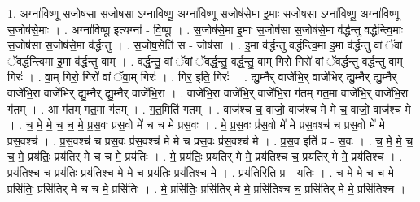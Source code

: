 \documentclass[17pt]{extarticle}
\begin{document}
1. अग्ना॑विष्णू स॒जोष॑सा स॒जोष॒सा ऽग्ना॑विष्णू॒ अग्ना॑विष्णू स॒जोष॑से॒मा इ॒माः स॒जोष॒सा ऽग्ना॑विष्णू॒ अग्ना॑विष्णू स॒जोष॑से॒माः । . अग्ना॑विष्णू॒ इत्यग्ना᳚ - वि॒ष्णू॒ । . स॒जोष॑से॒मा इ॒माः स॒जोष॑सा स॒जोष॑से॒मा व॑र्द्धन्तु वर्द्धन्त्वि॒माः स॒जोष॑सा स॒जोष॑से॒मा व॑र्द्धन्तु । . स॒जोष॒सेति॑ स - जोष॑सा । . इ॒मा व॑र्द्धन्तु वर्द्धन्त्वि॒मा इ॒मा व॑र्द्धन्तु वां ॅवां ॅवर्द्धन्त्वि॒मा इ॒मा व॑र्द्धन्तु वाम् । . व॒र्द्ध॒न्तु॒ वां॒ ॅवां॒ ॅव॒र्द्ध॒न्तु॒ व॒र्द्ध॒न्तु॒ वा॒म् गिरो॒ गिरो॑ वां ॅवर्द्धन्तु वर्द्धन्तु वा॒म् गिरः॑ । . वा॒म् गिरो॒ गिरो॑ वां ॅवा॒म् गिरः॑ । . गिर॒ इति॒ गिरः॑ । . द्यु॒म्नैर् वाजे॑भि॒र् वाजे॑भिर् द्यु॒म्नैर् द्यु॒म्नैर् वाजे॑भि॒रा वाजे॑भिर् द्यु॒म्नैर् द्यु॒म्नैर् वाजे॑भि॒रा । . वाजे॑भि॒रा वाजे॑भि॒र् वाजे॑भि॒रा ग॑तम् गत॒मा वाजे॑भि॒र् वाजे॑भि॒रा ग॑तम् । . आ ग॑तम् गत॒मा ग॑तम् । . ग॒त॒मिति॑ गतम् । . वाज॑श्च च॒ वाजो॒ वाज॑श्च मे मे च॒ वाजो॒ वाज॑श्च मे । . च॒ मे॒ मे॒ च॒ च॒ मे॒ प्र॒स॒वः प्र॑स॒वो मे॑ च च मे प्रस॒वः । . मे॒ प्र॒स॒वः प्र॑स॒वो मे॑ मे प्रस॒वश्च॑ च प्रस॒वो मे॑ मे प्रस॒वश्च॑ । . प्र॒स॒वश्च॑ च प्रस॒वः प्र॑स॒वश्च॑ मे मे च प्रस॒वः प्र॑स॒वश्च॑ मे । . प्र॒स॒व इति॑ प्र - स॒वः । . च॒ मे॒ मे॒ च॒ च॒ मे॒ प्रय॑तिः॒ प्रय॑तिर् मे च च मे॒ प्रय॑तिः । . मे॒ प्रय॑तिः॒ प्रय॑तिर् मे मे॒ प्रय॑तिश्च च॒ प्रय॑तिर् मे मे॒ प्रय॑तिश्च । . प्रय॑तिश्च च॒ प्रय॑तिः॒ प्रय॑तिश्च मे मे च॒ प्रय॑तिः॒ प्रय॑तिश्च मे । . प्रय॑ति॒रिति॒ प्र - य॒तिः॒ । . च॒ मे॒ मे॒ च॒ च॒ मे॒ प्रसि॑तिः॒ प्रसि॑तिर् मे च च मे॒ प्रसि॑तिः । . मे॒ प्रसि॑तिः॒ प्रसि॑तिर् मे मे॒ प्रसि॑तिश्च च॒ प्रसि॑तिर् मे मे॒ प्रसि॑तिश्च । \newline
\end{document}
